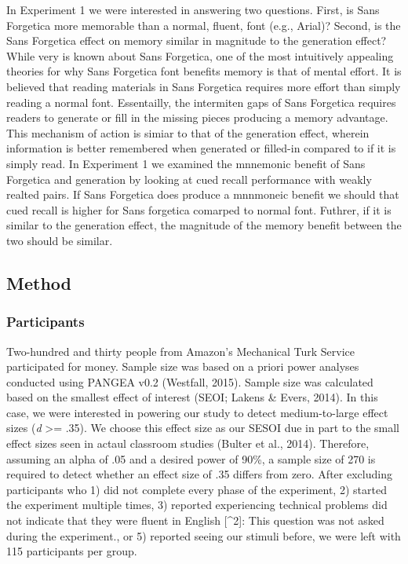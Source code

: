 \documentclass[english,doc]{apa6}
\begin{document}
In Experiment 1 we were interested in answering two questions. First, is Sans Forgetica more memorable than a normal, fluent, font (e.g., Arial)? Second, is the Sans Forgetica effect on memory similar in magnitude to the generation effect? While very is known about Sans Forgetica, one of the most intuitively appealing theories for why Sans Forgetica font benefits memory is that of mental effort. It is believed that reading materials in Sans Forgetica requires more effort than simply reading a normal font. Essentailly, the intermiten gaps of Sans Forgetica requires readers to generate or fill in the missing pieces producing a memory advantage. This mechanism of action is simiar to that of the generation effect, wherein information is better remembered when generated or filled-in compared to if it is simply read. In Experiment 1 we examined the mnnemonic benefit of Sans Forgetica and generation by looking at cued recall performance with weakly realted pairs. If Sans Forgetica does produce a mnnmoneic benefit we should that cued recall is higher for Sans forgetica comarped to normal font. Futhrer, if it is similar to the generation effect, the magnitude of the memory benefit between the two should be similar.

\hypertarget{method}{%
\subsection{Method}\label{method}}

\hypertarget{participants}{%
\subsubsection{Participants}\label{participants}}

Two-hundred and thirty people from Amazon's Mechanical Turk Service participated for money. Sample size was based on a priori power analyses conducted using PANGEA v0.2 (Westfall, 2015). Sample size was calculated based on the smallest effect of interest (SEOI; Lakens \& Evers, 2014). In this case, we were interested in powering our study to detect medium-to-large effect sizes (\emph{d} \textgreater{}= .35). We choose this effect size as our SESOI due in part to the small effect sizes seen in actaul classroom studies (Bulter et al., 2014). Therefore, assuming an alpha of .05 and a desired power of 90\%, a sample size of 270 is required to detect whether an effect size of .35 differs from zero. After excluding participants who 1) did not complete every phase of the experiment, 2) started the experiment multiple times, 3) reported experiencing technical problems did not indicate that they were fluent in English {[}\^{}2{]}: This question was not asked during the experiment., or 5) reported seeing our stimuli before, we were left with 115 participants per group.
\end{document}
